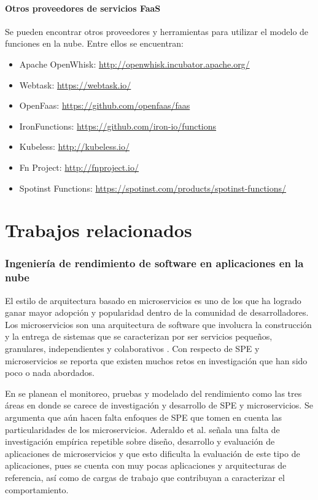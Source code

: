 \paragraph{Otros proveedores de servicios FaaS} Se pueden encontrar otros proveedores y herramientas para utilizar el modelo de funciones en la nube. Entre ellos se encuentran:
\begin{itemize}
    \item Apache OpenWhisk: \url{http://openwhisk.incubator.apache.org/}
    \item Webtask: \url{https://webtask.io/}
    \item OpenFaas: \url{https://github.com/openfaas/faas}
    \item IronFunctions: \url{https://github.com/iron-io/functions}
    \item Kubeless: \url{http://kubeless.io/}
    \item Fn Project: \url{http://fnproject.io/}
    \item Spotinst Functions: \url{https://spotinst.com/products/spotinst-functions/}
\end{itemize}

\newpage

\section{Trabajos relacionados}

\subsubsection{Ingeniería de rendimiento de software en aplicaciones en la nube}

El estilo de arquitectura basado en microservicios es uno de los que ha logrado ganar mayor adopción y popularidad dentro de la comunidad de desarrolladores. Los microservicios son una arquitectura de software que involucra la construcción y la entrega de sistemas que se caracterizan por ser servicios pequeños, granulares, independientes y colaborativos \cite{10.1007/978-3-319-62636-9_11}. Con respecto de SPE y microservicios se reporta que existen muchos retos en investigación que han sido poco o nada abordados. 

En \cite{Heinrich:2017:PEM:3053600.3053653} se planean el monitoreo, pruebas y modelado del rendimiento como las tres áreas en donde se carece de investigación y desarrollo de SPE y microservicios. Se argumenta que aún hacen falta enfoques de SPE que tomen en cuenta las particularidades de los microservicios. Aderaldo et al.\cite{7968049} señala una falta de investigación empírica repetible sobre diseño, desarrollo y evaluación de aplicaciones de microservicios y que esto dificulta la evaluación de este tipo de aplicaciones, pues se cuenta con muy pocas aplicaciones y arquitecturas de referencia, así como de cargas de trabajo que contribuyan a caracterizar el comportamiento.

